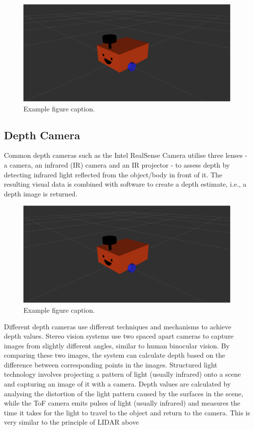 \begin{figure}[H]
\centering
\includegraphics[width=0.8\linewidth]{figs/robot.png}
\caption{Example figure caption.}
\end{figure}

\subsection{Depth Camera}
Common depth cameras such as the Intel RealSense Camera utilise three lenses - a camera, an infrared (IR) camera and an IR projector - to assess depth by detecting infrared light reflected from the object/body in front of it. The resulting visual data is combined with software to create a depth estimate, i.e., a depth image is returned.

\begin{figure}[H]
\centering
\includegraphics[width=0.8\linewidth]{figs/robot.png}
\caption{Example figure caption.}
\end{figure}
Different depth cameras use different techniques and mechanisms to achieve depth values. Stereo vision systems use two spaced apart cameras to capture images from slightly different angles, similar to human binocular vision. By comparing these two images, the system can calculate depth based on the difference between corresponding points in the images. Structured light technology involves projecting a pattern of light (usually infrared) onto a scene and capturing an image of it with a camera. Depth values are calculated by analysing the distortion of the light pattern caused by the surfaces in the scene, while the ToF camera emits pulses of light (usually infrared) and measures the time it takes for the light to travel to the object and return to the camera. This is very similar to the principle of LIDAR above

